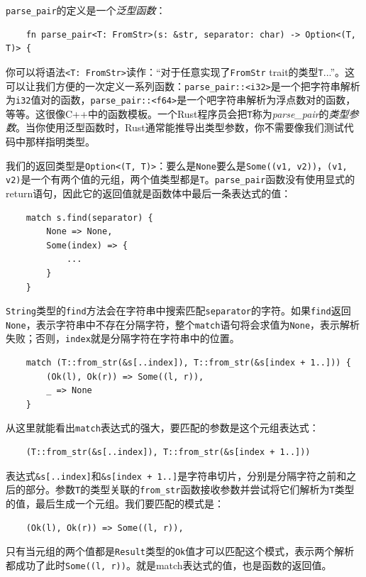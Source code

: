 \texttt{parse\_pair}的定义是一个\emph{泛型函数}：
\begin{verbatim}
    fn parse_pair<T: FromStr>(s: &str, separator: char) -> Option<(T, T)> {
\end{verbatim}

你可以将语法\texttt{<T: FromStr>}读作：“对于任意实现了\texttt{FromStr} trait的类型\texttt{T}...”。这可以让我们方便的一次定义一系列函数：\texttt{parse\_pair::<i32>}是一个把字符串解析为\texttt{i32}值对的函数，\texttt{parse\_pair::<f64>}是一个吧字符串解析为浮点数对的函数，等等。这很像C++中的函数模板。一个Rust程序员会把\texttt{T}称为\emph{parse\_pair}的\emph{类型参数}。当你使用泛型函数时，Rust通常能推导出类型参数，你不需要像我们测试代码中那样指明类型。

我们的返回类型是\texttt{Option<(T, T)>}：要么是\texttt{None}要么是\texttt{Some((v1, v2))}，\texttt{(v1, v2)}是一个有两个值的元组，两个值类型都是\texttt{T}。\texttt{parse\_pair}函数没有使用显式的return语句，因此它的返回值就是函数体中最后一条表达式的值：
\begin{verbatim}
    match s.find(separator) {
        None => None,
        Some(index) => {
            ...
        }
    }
\end{verbatim}

\texttt{String}类型的\texttt{find}方法会在字符串中搜索匹配\texttt{separator}的字符。如果\texttt{find}返回\texttt{None}，表示字符串中不存在分隔字符，整个\texttt{match}语句将会求值为\texttt{None}，表示解析失败；否则，\texttt{index}就是分隔字符在字符串中的位置。

\begin{verbatim}
    match (T::from_str(&s[..index]), T::from_str(&s[index + 1..])) {
        (Ok(l), Ok(r)) => Some((l, r)),
        _ => None
    }
\end{verbatim}

从这里就能看出\texttt{match}表达式的强大，要匹配的参数是这个元组表达式：
\begin{verbatim}
    (T::from_str(&s[..index]), T::from_str(&s[index + 1..]))
\end{verbatim}
表达式\texttt{\&s[..index]}和\texttt{\&s[index + 1..]}是字符串切片，分别是分隔字符之前和之后的部分。参数\texttt{T}的类型关联的\texttt{from\_str}函数接收参数并尝试将它们解析为\texttt{T}类型的值，最后生成一个元组。我们要匹配的模式是：
\begin{verbatim}
    (Ok(l), Ok(r)) => Some((l, r)),
\end{verbatim}

只有当元组的两个值都是\texttt{Result}类型的\texttt{Ok}值才可以匹配这个模式，表示两个解析都成功了此时\texttt{Some((l, r))}。就是match表达式的值，也是函数的返回值。

